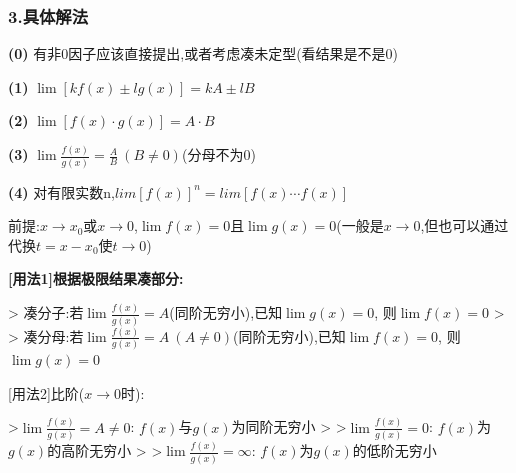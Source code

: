 \documentclass[11pt,a4paper,UTF8]{ctexart}
\begin{document}
\subsubsection{3.具体解法}

\begin{thmbox}[{解法[1]: [代数]四则运算}]

\textbf{(0)} 有非0因子应该直接提出,或者考虑凑未定型(看结果是不是0)

\textbf{(1)} $\lim[kf(x) \pm lg(x)] = kA \pm lB$

\textbf{(2)} $\lim[f(x) \cdot g(x)] = A \cdot B$

\textbf{(3)} $\lim\frac{f(x)}{g(x)} = \frac{A}{B}\ (B \ne 0)$(分母不为0)

\textbf{(4)} 对有限实数n,$lim[f(x)]^n = lim[f(x)\cdots f(x)]$

\end{thmbox}
\begin{thmbox}[{解法[2]: [代数]柯西体系比阶[需要趋于0]}]

    前提:$x \to x_0$或$x \to 0$,$\lim f(x) = 0$且$\lim g(x) = 0$(一般是$x \to 0$,但也可以通过代换$t = x - x_0$使$t \to 0$)

    \textbf{[用法1]根据极限结果凑部分:}

    >   凑分子:若$\lim \frac{f(x)}{g(x)} = A$(同阶无穷小),已知$\lim g(x) = 0$,	则$\lim f(x) = 0$
    >
    >   凑分母:若$\lim \frac{f(x)}{g(x)} = A\ (A \neq 0)$(同阶无穷小),已知$\lim f(x) = 0$, 则$\lim g(x) = 0$

    \textit{}[用法2]比阶($x \to 0$时):\textit{}

    >$\lim \frac{f(x)}{g(x)} = A \neq 0$:    $f(x)$与$g(x)$为同阶无穷小
    >
    >$\lim \frac{f(x)}{g(x)} = 0$:	$f(x)$为$g(x)$的高阶无穷小
    >
    >$\lim \frac{f(x)}{g(x)} = \infty$:	$f(x)$为$g(x)$的低阶无穷小

\end{thmbox}
\end{document}
